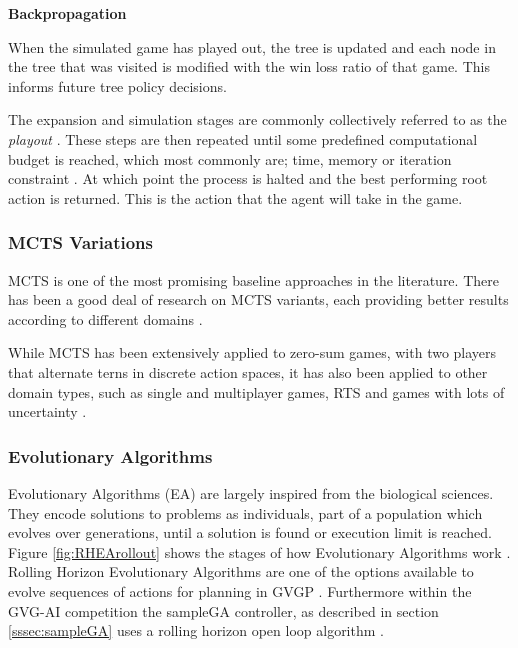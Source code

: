\documentclass[journal]{IEEEtran}
\begin{document}
		\textbf{Backpropagation}
		
			When the simulated game has played out, the tree is updated and each node in the tree that was visited is modified with the win loss ratio of that game. This informs future tree policy decisions.
			
			The expansion and simulation stages are commonly collectively referred to as the \textit{playout} \cite{powley2014information}.
			These steps are then repeated until some predefined computational budget is reached, which most commonly are; time, memory or iteration constraint \cite{browne2012survey}. At which point the process is halted and the best performing root action is returned. This is the action that the agent will take in the game.


		


		\subsubsection{MCTS Variations} \label{sssec:MCTSvariations}
			MCTS is one of the most promising baseline approaches in the  literature.
			There has been a good deal of research on MCTS variants, each providing better results according to different domains \cite{browne2012survey, park2015mcts, perez2014knowledge, ilhan2017monte, de2016monte, frydenberg2015investigating, subramanianefficient}.

			While MCTS has been extensively applied to zero-sum games, with two players that alternate terns in discrete action spaces, it has also been applied to other domain types, such as single and multiplayer games, RTS and games with lots of uncertainty \cite{browne2012survey, de2016monte, frydenberg2015investigating}.

		


		\subsubsection{Evolutionary Algorithms} \label{sssec:EA}
			Evolutionary Algorithms (EA) are largely inspired from the biological sciences. They encode solutions to problems as individuals, part of a population which evolves over generations, until a solution is found or execution limit is reached. Figure \ref{fig:RHEArollout} shows the stages of how Evolutionary Algorithms work \cite{gaina2017rolling}.
			Rolling Horizon Evolutionary Algorithms are one of the options available to evolve sequences of actions for planning in GVGP \cite{perez2013rolling}. Furthermore within the GVG-AI competition the sampleGA controller, as described in section \ref{sssec:sampleGA} uses a rolling horizon open loop algorithm \cite{perez20162014}.
\end{document}

